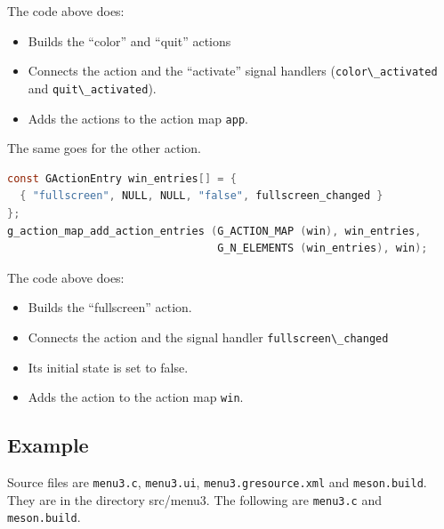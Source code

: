 The code above does:

\begin{itemize}
\tightlist
\item
  Builds the ``color'' and ``quit'' actions
\item
  Connects the action and the ``activate'' signal handlers
  (\passthrough{\lstinline!color\_activated!} and
  \passthrough{\lstinline!quit\_activated!}).
\item
  Adds the actions to the action map \passthrough{\lstinline!app!}.
\end{itemize}

The same goes for the other action.

\begin{lstlisting}[language=C]
const GActionEntry win_entries[] = {
  { "fullscreen", NULL, NULL, "false", fullscreen_changed }
};
g_action_map_add_action_entries (G_ACTION_MAP (win), win_entries,
                                 G_N_ELEMENTS (win_entries), win);
\end{lstlisting}

The code above does:

\begin{itemize}
\tightlist
\item
  Builds the ``fullscreen'' action.
\item
  Connects the action and the signal handler
  \passthrough{\lstinline!fullscreen\_changed!}
\item
  Its initial state is set to false.
\item
  Adds the action to the action map \passthrough{\lstinline!win!}.
\end{itemize}

\subsection{Example}\label{example}

Source files are \passthrough{\lstinline!menu3.c!},
\passthrough{\lstinline!menu3.ui!},
\passthrough{\lstinline!menu3.gresource.xml!} and
\passthrough{\lstinline!meson.build!}. They are in the directory
src/menu3. The following are \passthrough{\lstinline!menu3.c!} and
\passthrough{\lstinline!meson.build!}.

